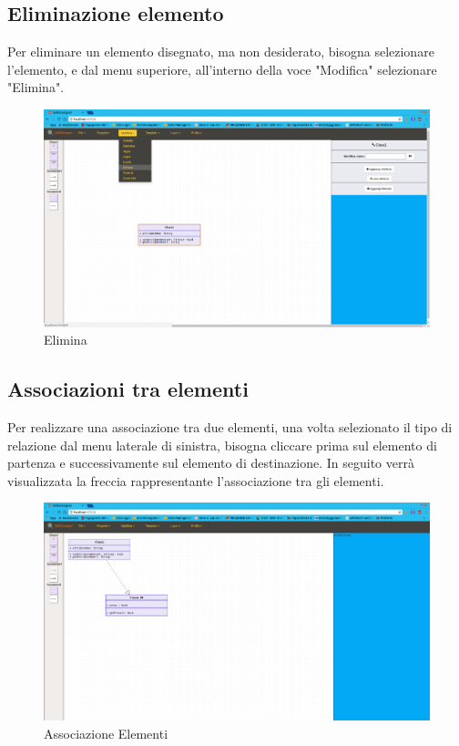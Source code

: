 \subsection{Eliminazione elemento}
Per eliminare un elemento disegnato, ma non desiderato, bisogna selezionare l'elemento, e dal menu superiore, all'interno della voce "Modifica" selezionare "Elimina".
\begin{figure}[h!]
	\centering
		\includegraphics[scale=1]{../img/elimina.png}
	\caption{Elimina}
\end{figure}
\newpage

\subsection{Associazioni tra elementi}
Per realizzare una associazione tra due elementi, una volta selezionato il tipo di relazione dal menu laterale di sinistra, bisogna cliccare prima sul elemento di partenza e successivamente sul elemento di destinazione. In seguito verrà visualizzata la freccia rappresentante l'associazione tra gli elementi.
\begin{figure}[h!]
	\centering
		\includegraphics[scale=1]{../img/associazioneElementi.png}
	\caption{Associazione Elementi}
\end{figure}